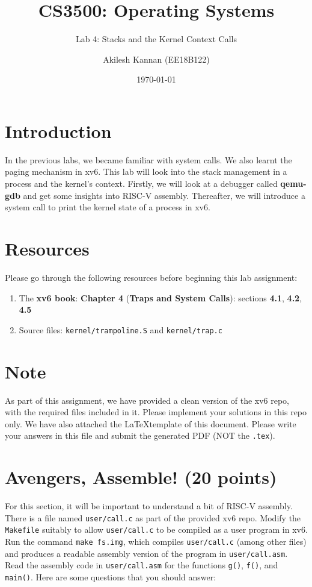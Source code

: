\documentclass[11pt]{exam}
\title{\textbf{CS3500: Operating Systems}}
\subtitle{Lab 4: Stacks and the Kernel Context Calls}
\date{\today}
\author{Akilesh Kannan (EE18B122)}
\begin{document}
\maketitle

\section*{Introduction} In the previous labs, we became familiar with system calls. We also learnt the paging mechanism in xv6. This lab will look into the stack management in a process and the kernel's context. Firstly, we will look at a debugger called \textbf{qemu-gdb} and get some insights into RISC-V assembly. Thereafter, we will introduce a system call to print the kernel state of a process in xv6.

\section*{Resources} Please go through the following resources before beginning this lab assignment:
\begin{enumerate}
    \item The \textbf{xv6 book}: \textbf{Chapter 4} (\textbf{Traps and System Calls}): sections \textbf{4.1}, \textbf{4.2}, \textbf{4.5}
    \item Source files: \texttt{kernel/trampoline.S} and \texttt{kernel/trap.c}
\end{enumerate}

\section*{Note} As part of this assignment, we have provided a clean version of the xv6 repo, with the required files included in it. Please implement your solutions in this repo only. We have also attached the \LaTeX template of this document. Please write your answers in this file and submit the generated PDF (NOT the \texttt{.tex}). 

\section{Avengers, Assemble! (20 points)}
For this section, it will be important to understand a bit of RISC-V assembly. \\

\noindent There is a file named \texttt{user/call.c} as part of the provided xv6 repo. Modify the \texttt{Makefile} suitably to allow \texttt{user/call.c} to be compiled as a user program in xv6. Run the command \texttt{make fs.img}, which compiles \texttt{user/call.c} (among other files) and produces a readable assembly version of the program in \texttt{user/call.asm}. \noindent Read the assembly code in \texttt{user/call.asm} for the functions \texttt{g()}, \texttt{f()}, and \texttt{main()}. Here are some questions that you should answer:
\end{document}
